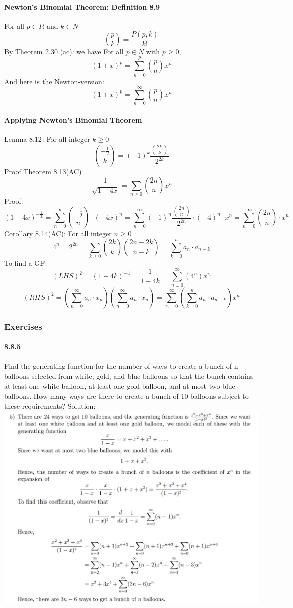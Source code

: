 \documentclass{article}
\begin{document}
\paragraph{Newton's Binomial Theorem: Definition 8.9}
For all $p\in R$ and $k\in N$
$$\binom{p}{k}=\frac{P(p,k)}{k!}$$
By Theorem 2.30 (ac): we have \newline
For all $p\in N$ with $p\ge 0$,
$$(1+x)^p=\sum_{n=0}^{p}\binom{p}{n}x^n$$
And here is the Newton-version:
$$(1+x)^p=\sum_{n=0}^{\infty}\binom{p}{n}x^n$$
\paragraph{Applying Newton’s Binomial Theorem} 
Lemma 8.12:\newline
For all integer $k\ge 0$
$$\binom{-\frac{1}{2}}{k}=(-1)^k\frac{\binom{2k}{k}}{2^{2k}}$$
Proof Theorem 8.13(AC)
$$\frac{1}{\sqrt{1-4x}}=\sum_{n\ge 0}\binom{2n}{n}x^n$$
Proof:
$$(1-4x)^{-\frac{1}{2}}=\sum_{n=0}^{\infty}\binom{-\frac{1}{2}}{n}\cdot (-4x)^n=\sum_{n=0}^{\infty}(-1)^n\frac{\binom{2n}{n}}{2^{2n}}\cdot (-4)^n \cdot x^n=\sum_{n=0}^{\infty}\binom{2n}{n}\cdot x^n$$
Corollary 8.14(AC):\newline
For all integer $n\ge 0$
$$4^n=2^{2n}=\sum_{k\ge 0}\binom{2k}{k}\binom{2n-2k}{n-k}=\sum_{k=0}^na_n\cdot a_{n-k}$$
To find a GF:
$$(LHS)^2=(1-4k)^{-1}=\frac{1}{1-4k}=\sum_{n=0}^{\infty}(4^n)x^n$$
$$(RHS)^2=(\sum_{n=0}^{\infty}a_n\cdot x_n)(\sum_{n=0}^{\infty}a_n\cdot x_n)=\sum_{n=0}^{\infty}(\sum_{k=0}^na_n\cdot a_{n-k})x^n$$
\subsubsection{Exercises}
\paragraph{8.8.5}
Find the generating function for the number of ways to create a bunch of n balloons
selected from white, gold, and blue balloons so that the bunch contains at least one
white balloon, at least one gold balloon, and at most two blue balloons. How many
ways are there to create a bunch of 10 balloons subject to these requirements?\newline
Solution:\newline
\includegraphics{0015}
\end{document}
